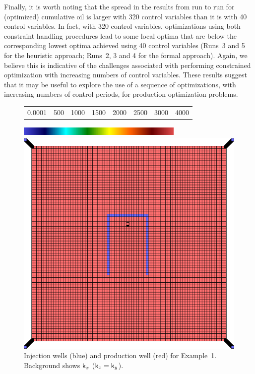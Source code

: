 \documentclass[twocolumn,numbook]{svjour3}          %
\begin{document}
Finally, it is worth noting that the spread in the results from run to run for (optimized) cumulative oil is larger with 320 control variables than it is with 40 control variables. In fact, with 320 control variables, optimizations using both constraint handling procedures lead to some local optima that are below the corresponding lowest optima achieved using 40 control variables (Runs~3 and 5 for the heuristic approach; Runs~2, 3 and 4 for the formal approach). Again, we believe this is indicative of the challenges associated with performing constrained optimization with increasing numbers of control variables. These results suggest that it may be useful to explore the use of a sequence of optimizations, with increasing numbers of control periods, for production optimization problems.






\begin{figure}[ht]
\begin{center}
     \begin{tabular}{cccccccc}
      0.0001 &  500 & 1000 & 1500 & 2000 & 2500 & 3000 &4000
      \end{tabular}
      \includegraphics[width=8cm, height=0.5cm]{VanEssenModelPermeabilityMapColorBar.png}
       
       \medskip

       \includegraphics[totalheight=3.in]{PiPermeabilityMapAndWells.png} 
       \end{center}
     \caption{Injection wells (blue) and production well (red) for Example~1. Background shows $\mathsf{k}_x$ ($ \mathsf{k}_x = \mathsf{k}_y$).}
  \label{fig:PImodelPermeabilityMapAndWells}
\end{figure}
\end{document}

